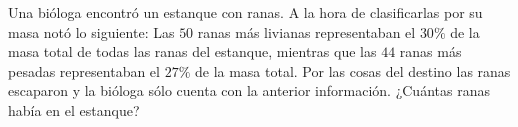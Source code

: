 Una bióloga encontró un estanque con ranas. A la hora de clasificarlas por su masa notó lo siguiente: Las $50$ ranas más livianas representaban el $30\%$ de la masa total de todas las ranas del estanque, mientras que las $44$ ranas más pesadas representaban el $27\%$ de la masa total. Por las cosas del destino las ranas escaparon y la bióloga sólo cuenta con la anterior información. ¿Cuántas ranas había en el estanque?